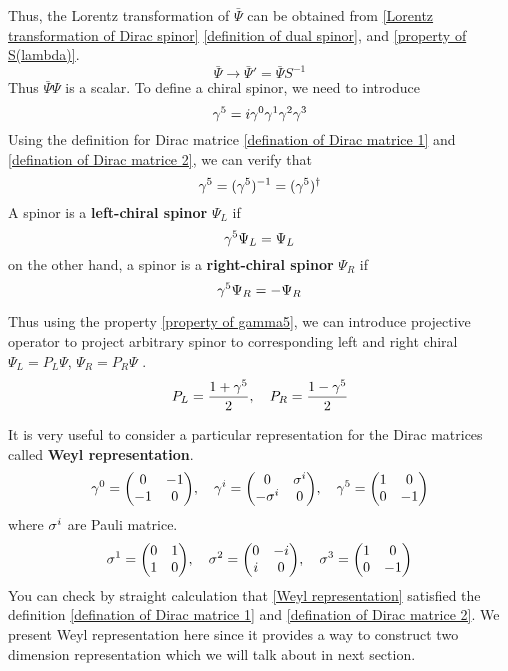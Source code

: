 Thus, the Lorentz transformation of $\bar{\Psi}$ can be obtained from \eqref{Lorentz transformation of Dirac spinor}  \eqref{definition of dual spinor}, and \eqref{property of S(lambda)}.
\begin{equation} \label{Lorentz transformation of barPsi}
\bar\Psi \rightarrow \bar{\Psi}' = \bar{\Psi}S^{-1}
\end{equation}
Thus $\bar{\Psi}\Psi$ is a scalar.
To define a chiral spinor, we need to introduce
\begin{equation}
  \gamma^5 = i\gamma^0\gamma^1\gamma^2\gamma^3
\end{equation}
Using the definition for Dirac matrice \eqref{defination of Dirac matrice 1} and \eqref{defination of Dirac matrice 2}, we can verify that
\begin{equation} \label{property of gamma5}
\gamma^5 =(\gamma^5)^{-1} = (\gamma^5)^{\dagger}
\end{equation}
A spinor is a \textbf{left-chiral spinor} $\Psi_L$ if
\begin{equation} \label{definition of left chiral spinor}
\gamma^5\Psi_L = \Psi_L
\end{equation}
on the other hand, a spinor is a \textbf{right-chiral spinor} $\Psi_R$ if
\begin{equation} \label{definition of right chiral spinor}
\gamma^5 \Psi_R = -\Psi_R
\end{equation}


Thus using the property \eqref{property of gamma5}, we can introduce projective operator to project arbitrary spinor to corresponding left and right chiral $\Psi_L = P_L\Psi$, $\Psi_R = P_R\Psi$ .
\begin{equation}
  P_L = \frac{1+\gamma^5}{2} ,\quad P_R = \frac{1-\gamma^5}{2}
\end{equation}

It is very useful to consider a particular representation for the Dirac matrices called \textbf{Weyl representation}.
\begin{equation} \label{Weyl representation}
\g^0 = \mqty(  0 & -1\\
-1 &  0),\quad
\g^i = \mqty(  0 &  \s^{i}\\
-\s^{i}&   0   ),\quad
\g^5 = \mqty(  1 &  0\\
0 & -1)
\end{equation}
where $\sigma^i$ are Pauli matrice.
\begin{equation} \label{Pauli matrice}
\s^1 = \mqty( 0 & 1 \\
1 & 0),\quad
\s^2 = \mqty( 0 & -i \\
i & 0),\quad
\s^3 = \mqty( 1 & 0 \\
0 & -1)
\end{equation}
You can check by straight calculation that \eqref{Weyl representation} satisfied the definition \eqref{defination of Dirac matrice 1} and \eqref{defination of Dirac matrice 2}. We present Weyl representation here since it provides a way to construct two dimension representation which we will talk about in next section.

